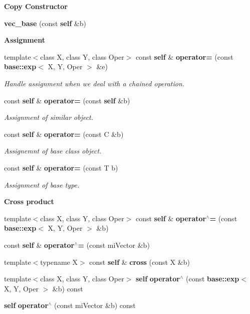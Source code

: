 \begin{Indent}{\bf Copy Constructor}\par
\begin{CompactItemize}
\item 
{\bf vec\_\-base} (const {\bf self} \&b)
\end{CompactItemize}
\end{Indent}
\begin{Indent}{\bf Assignment}\par
\begin{CompactItemize}
\item 
template$<$class X, class Y, class Oper$>$ const {\bf self} \& {\bf operator=} (const {\bf base::exp}$<$ X, Y, Oper $>$ \&e)
\begin{CompactList}\small\item\em Handle assignment when we deal with a chained operation. \item\end{CompactList}\item 
const {\bf self} \& {\bf operator=} (const {\bf self} \&b)
\begin{CompactList}\small\item\em Assignment of similar object. \item\end{CompactList}\item 
const {\bf self} \& {\bf operator=} (const C \&b)
\begin{CompactList}\small\item\em Assignemnt of base class object. \item\end{CompactList}\item 
const {\bf self} \& {\bf operator=} (const T b)
\begin{CompactList}\small\item\em Assignment of base type. \item\end{CompactList}\end{CompactItemize}
\end{Indent}
\begin{Indent}{\bf Cross product}\par
\begin{CompactItemize}
\item 
template$<$class X, class Y, class Oper$>$ const {\bf self} \& {\bf operator$^\wedge$=} (const {\bf base::exp}$<$ X, Y, Oper $>$ \&b)
\item 
const {\bf self} \& {\bf operator$^\wedge$=} (const mi\-Vector \&b)
\item 
template$<$typename X$>$ const {\bf self} \& {\bf cross} (const X \&b)
\item 
template$<$class X, class Y, class Oper$>$ {\bf self} {\bf operator$^\wedge$} (const {\bf base::exp}$<$ X, Y, Oper $>$ \&b) const 
\item 
{\bf self} {\bf operator$^\wedge$} (const mi\-Vector \&b) const 
\end{CompactItemize}
\end{Indent}
